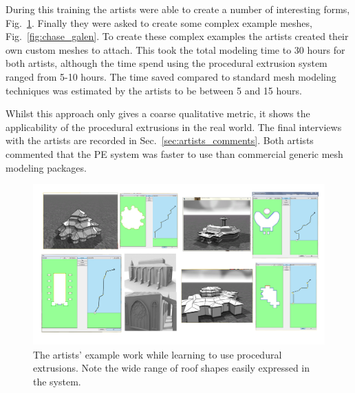 During this training the artists were able to create a number of interesting forms, Fig.~\ref{fig:chase_galen_funtime}. Finally they were asked to create some complex example meshes, Fig.~\ref{fig:chase_galen}. To create these complex examples the artists created their own custom meshes to attach. This took the total modeling time to 30 hours for both artists, although the time spend using the procedural extrusion system ranged from 5-10 hours. The time saved compared to standard mesh modeling techniques was estimated by the artists to be between 5 and 15 hours.

Whilst this approach only gives a coarse qualitative metric, it shows the applicability of the procedural extrusions in the real world. The final interviews with the artists are recorded in Sec.~\ref{sec:artists_comments}. Both artists commented that the PE system was faster to use than commercial generic mesh modeling packages.

\begin{figure}
  \centering
  \includegraphics[width=1.0\columnwidth]{chase_galen_funtime.png}
  \caption[Artist's use of PEs]{\label{fig:chase_galen_funtime}The artists' example work while learning to use procedural extrusions. Note the wide range of roof shapes easily expressed in the system.}
\end{figure}



